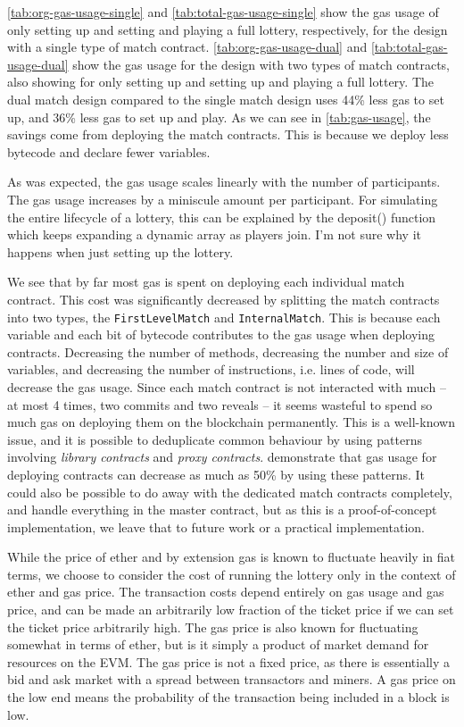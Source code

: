 \noindent
\ref{tab:org-gas-usage-single} and \ref{tab:total-gas-usage-single} show the gas usage of only setting up and setting and playing a full lottery, respectively, for the design with a single type of match contract. \ref{tab:org-gas-usage-dual} and \ref{tab:total-gas-usage-dual} show the gas usage for the design with two types of match contracts, also showing for only setting up and setting up and playing a full lottery.
The dual match design compared to the single match design uses 44\% less gas to set up, and 36\% less gas to set up and play. As we can see in \ref{tab:gas-usage}, the savings come from deploying the match contracts. This is because we deploy less bytecode and declare fewer variables.

As was expected, the gas usage scales linearly with the number of participants. The gas usage increases by a miniscule amount per participant. For simulating the entire lifecycle of a lottery, this can be explained by the deposit() function which keeps expanding a dynamic array as players join. I'm not sure why it happens when just setting up the lottery.

We see that by far most gas is spent on deploying each individual match contract. This cost was significantly decreased by splitting the match contracts into two types, the \texttt{FirstLevelMatch} and \texttt{InternalMatch}. This is because each variable and each bit of bytecode contributes to the gas usage when deploying contracts. Decreasing the number of methods, decreasing the number and size of variables, and decreasing the number of instructions, i.e. lines of code, will decrease the gas usage. Since each match contract is not interacted with much – at most 4 times, two commits and two reveals – it seems wasteful to spend so much gas on deploying them on the blockchain permanently. This is a well-known issue, and it is possible to deduplicate common behaviour by using patterns involving \emph{library contracts} and \emph{proxy contracts}. \cite{lu_solidity_2018} demonstrate that gas usage for deploying contracts can decrease as much as 50\% by using these patterns. It could also be possible to do away with the dedicated match contracts completely, and handle everything in the master contract, but as this is a proof-of-concept implementation, we leave that to future work or a practical implementation.

While the price of ether and by extension gas is known to fluctuate heavily in fiat terms, we choose to consider the cost of running the lottery only in the context of ether and gas price. The transaction costs depend entirely on gas usage and gas price, and can be made an arbitrarily low fraction of the ticket price if we can set the ticket price arbitrarily high. The gas price is also known for fluctuating somewhat in terms of ether, but is it simply a product of market demand for resources on the EVM. The gas price is not a fixed price, as there is essentially a bid and ask market with a spread between transactors and miners. A gas price on the low end means the probability of the transaction being included in a block is low. 

